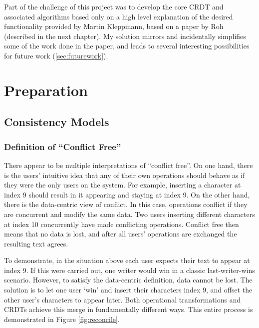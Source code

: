 \documentclass[12pt,a4paper,twoside,openright]{report}
\begin{document}
Part of the challenge of this project was to develop the core CRDT and associated algorithms based only on a high level explanation of the desired functionality provided by Martin Kleppmann, based on a paper by Roh~\cite{roh2011replicated} (described in the next chapter). My solution mirrors and incidentally simplifies some of the work done in the paper, and leads to several interesting possibilities for future work (\cref{sec:futurework}). 


\chapter{Preparation}


\section{Consistency Models}

	\subsection{Definition of ``Conflict Free''}
	
	There appear to be multiple interpretations of ``conflict free''. On one hand, there is the users' intuitive idea that any of their own operations should behave as if they were the only users on the system. For example, inserting a character at index 9 should result in it appearing and staying at index 9. On the other hand, there is the data-centric view of conflict. In this case, operations conflict if they are concurrent and modify the same data. Two users inserting different characters at index 10 concurrently have made conflicting operations. Conflict free then means that no data is lost, and after all users' operations are exchanged the resulting text agrees.
	
	To demonstrate, in the situation above each user expects their text to appear at index 9. If this were carried out, one writer would win in a classic last-writer-wins scenario. However, to satisfy the data-centric definition, data cannot be lost. The solution is to let one user `win' and insert their characters index 9, and offset the other user's characters to appear later. Both operational transformations and CRDTs achieve this merge in fundamentally different ways. This entire process is demonstrated in Figure \ref{fig:reconcile}.
	
\end{document}
